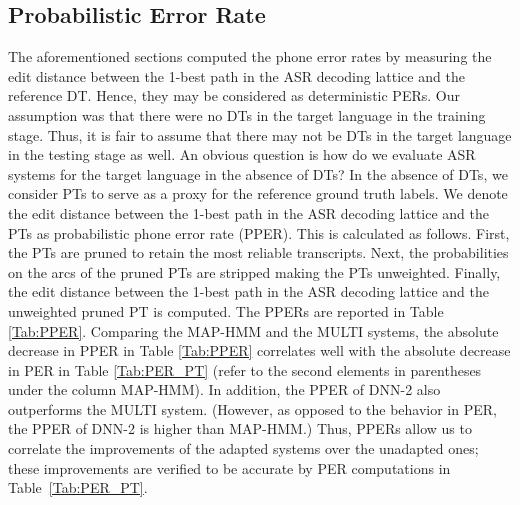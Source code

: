 \documentclass[a4paper]{article}
\begin{document}
\subsection{Probabilistic Error Rate}
\label{sec:Probabilistic Error Rate}
The aforementioned sections computed the phone error rates by measuring the edit distance between the 1-best path in the ASR decoding lattice and the reference DT. Hence, they may be considered as deterministic PERs. Our assumption was that there were no DTs in the target language in the training stage. Thus, it is fair to assume that there may not be DTs in the target language in the testing stage as well. An obvious question is how do we evaluate ASR systems for the target language in the absence of DTs? In the absence of DTs, we consider PTs to serve as a proxy for the reference ground truth labels. We denote the edit distance between the 1-best path in the ASR decoding lattice and the PTs as probabilistic phone error rate (PPER).
This is calculated as follows. First, the PTs are pruned to retain the most reliable transcripts. Next, the probabilities on the arcs of the pruned PTs are stripped making the PTs unweighted. Finally, the edit distance between the 1-best path in the ASR decoding lattice and the unweighted pruned PT is computed. The PPERs are reported in Table \ref{Tab:PPER}. Comparing the MAP-HMM and the MULTI systems, the absolute decrease in PPER in Table \ref{Tab:PPER} correlates well with the absolute decrease in PER in Table \ref{Tab:PER_PT} (refer to the second elements in parentheses under the column MAP-HMM). In addition, the PPER of DNN-2 also outperforms the MULTI system. (However, as opposed to the behavior in PER, the PPER of DNN-2 is higher than MAP-HMM.) Thus, PPERs allow us to correlate the improvements of the adapted systems over the unadapted ones; these improvements are verified to be accurate by PER computations in Table~\ref{Tab:PER_PT}.

\end{document}
